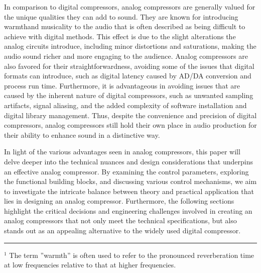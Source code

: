\documentclass[10pt]{article}
\begin{document}
\begin{multicols*}{2}
            In comparison to digital compressors, analog compressors are generally valued for the unique qualities they can add to sound. They are known for introducing warmth\footnotemark and musicality to the audio that is often described as being difficult to achieve with digital methods. \cite{sos-warmth} This effect is due to the slight alterations the analog circuits introduce, including minor distortions and saturations, making the audio sound richer and more engaging to the audience. Analog compressors are also favored for their straightforwardness, avoiding some of the issues that digital formats can introduce, such as digital latency caused by AD/DA conversion and process run time. Furthermore, it is advantageous in avoiding issues that are caused by the inherent nature of digital compressors, such as unwanted sampling artifacts, signal aliasing, and the added complexity of software installation and digital library management. Thus, despite the convenience and precision of digital compressors, analog compressors still hold their own place in audio production for their ability to enhance sound in a distinctive way.\par
            In light of the various advantages seen in analog compressors, this paper will delve deeper into the technical nuances and design considerations that underpins an effective analog compressor. By examining the control parameters, exploring the functional building blocks, and discussing various control mechanisms, we aim to investigate the intricate balance between theory and practical application that lies in designing an analog compressor. Furthermore, the following sections highlight the critical decisions and engineering challenges involved in creating an analog compressors that not only meet the technical specifications, but also stands out as an appealing alternative to the widely used digital compressor.

            \vspace{2cm}

            \par\noindent\rule{\linewidth}{0.5pt}
            \begin{minipage}[b]{\linewidth}
                \vspace{2pt}
                \footnotesize{$^1$ The term ''warmth'' is often used to refer to the pronounced reverberation time at low frequencies relative to that at higher frequencies.} \cite{britanica-warmth}
            \end{minipage}\hfill


\end{multicols*}
\end{document}
